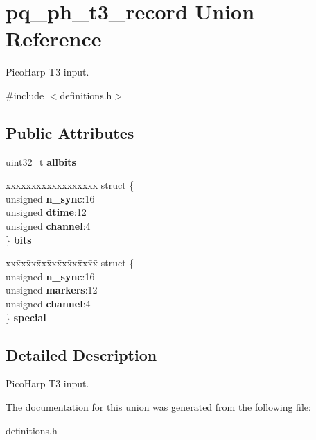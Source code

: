 \hypertarget{unionpq__ph__t3__record}{}\section{pq\+\_\+ph\+\_\+t3\+\_\+record Union Reference}
\label{unionpq__ph__t3__record}


Pico\+Harp T3 input.  




{\ttfamily \#include $<$definitions.\+h$>$}

\subsection*{Public Attributes}
\begin{DoxyCompactItemize}
\item 
\mbox{\label{unionpq__ph__t3__record_a2bf88b097b7963932a1c71c5af64dc2b}} 
uint32\+\_\+t {\bfseries allbits}
\item 
\mbox{\label{unionpq__ph__t3__record_a7a6d74fd6c3f0e0d1a50264e944377f6}} 
\begin{tabbing}
xx\=xx\=xx\=xx\=xx\=xx\=xx\=xx\=xx\=\kill
struct \{\\
\>unsigned {\bfseries n\_sync}:16\\
\>unsigned {\bfseries dtime}:12\\
\>unsigned {\bfseries channel}:4\\
\} {\bfseries bits}\\

\end{tabbing}\item 
\mbox{\label{unionpq__ph__t3__record_ad8869ed925b1326183908e0c8b7adfe1}} 
\begin{tabbing}
xx\=xx\=xx\=xx\=xx\=xx\=xx\=xx\=xx\=\kill
struct \{\\
\>unsigned {\bfseries n\_sync}:16\\
\>unsigned {\bfseries markers}:12\\
\>unsigned {\bfseries channel}:4\\
\} {\bfseries special}\\

\end{tabbing}\end{DoxyCompactItemize}


\subsection{Detailed Description}
Pico\+Harp T3 input. 

The documentation for this union was generated from the following file\+:\begin{DoxyCompactItemize}
\item 
definitions.\+h\end{DoxyCompactItemize}

